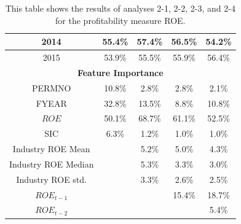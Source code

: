 {{\begin{table}[]
{\begin{tabular}{ccccc}
\multicolumn{1}{|c|}{2014}                & \multicolumn{1}{c|}{55.4\%}       & \multicolumn{1}{c|}{57.4\%}       & \multicolumn{1}{c|}{56.5\%}       & \multicolumn{1}{c|}{54.2\%}       \\ \hline
\multicolumn{1}{|c|}{2015}                & \multicolumn{1}{c|}{53.9\%}       & \multicolumn{1}{c|}{55.5\%}       & \multicolumn{1}{c|}{55.9\%}       & \multicolumn{1}{c|}{56.4\%}       \\ \hline
\multicolumn{5}{|c|}{\textbf{Feature Importance}}                                                                                                                                         \\ \hline
\multicolumn{1}{|c|}{PERMNO}              & \multicolumn{1}{c|}{10.8\%}       & \multicolumn{1}{c|}{2.8\%}        & \multicolumn{1}{c|}{2.8\%}        & \multicolumn{1}{c|}{2.1\%}        \\ \hline
\multicolumn{1}{|c|}{FYEAR}               & \multicolumn{1}{c|}{32.8\%}       & \multicolumn{1}{c|}{13.5\%}       & \multicolumn{1}{c|}{8.8\%}        & \multicolumn{1}{c|}{10.8\%}       \\ \hline
\multicolumn{1}{|c|}{$ROE$}               & \multicolumn{1}{c|}{50.1\%}       & \multicolumn{1}{c|}{68.7\%}       & \multicolumn{1}{c|}{61.1\%}       & \multicolumn{1}{c|}{52.5\%}       \\ \hline
\multicolumn{1}{|c|}{SIC}                 & \multicolumn{1}{c|}{6.3\%}        & \multicolumn{1}{c|}{1.2\%}        & \multicolumn{1}{c|}{1.0\%}        & \multicolumn{1}{c|}{1.0\%}        \\ \hline
\multicolumn{1}{|c|}{Industry ROE Mean}   & \multicolumn{1}{c|}{}             & \multicolumn{1}{c|}{5.2\%}        & \multicolumn{1}{c|}{5.0\%}        & \multicolumn{1}{c|}{4.3\%}        \\ \hline
\multicolumn{1}{|c|}{Industry ROE Median} & \multicolumn{1}{c|}{}             & \multicolumn{1}{c|}{5.3\%}        & \multicolumn{1}{c|}{3.3\%}        & \multicolumn{1}{c|}{3.0\%}        \\ \hline
\multicolumn{1}{|c|}{Industry ROE std.}   & \multicolumn{1}{c|}{}             & \multicolumn{1}{c|}{3.3\%}        & \multicolumn{1}{c|}{2.6\%}        & \multicolumn{1}{c|}{2.5\%}        \\ \hline
\multicolumn{1}{|c|}{$ROE_{t-1}$}         & \multicolumn{1}{c|}{}             & \multicolumn{1}{c|}{}             & \multicolumn{1}{c|}{15.4\%}       & \multicolumn{1}{c|}{18.7\%}       \\ \hline
\multicolumn{1}{|c|}{$ROE_{t-2}$}         & \multicolumn{1}{c|}{}             & \multicolumn{1}{c|}{}             & \multicolumn{1}{c|}{}             & \multicolumn{1}{c|}{5.4\%}        \\ \hline
\end{tabular}}
\caption{This table shows the results of analyses 2-1, 2-2, 2-3, and 2-4 for the profitability measure ROE.}
\label{tab:ROE-2}
\end{table}

}}
